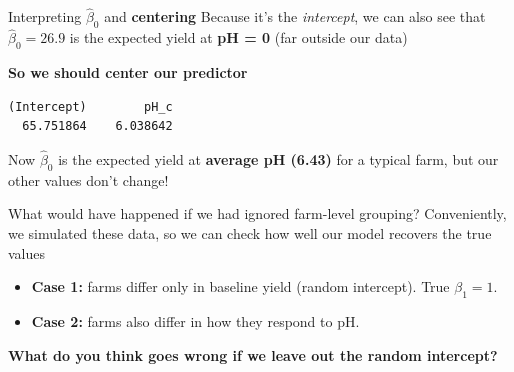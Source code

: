 \documentclass[
  ignorenonframetext,
  aspectratio=169,
]{beamer}
\newenvironment{Shaded}{\begin{snugshade}}{\end{snugshade}}
\newcommand{\AttributeTok}[1]{\textcolor[rgb]{0.40,0.45,0.13}{#1}}
\newcommand{\DecValTok}[1]{\textcolor[rgb]{0.68,0.00,0.00}{#1}}
\newcommand{\FunctionTok}[1]{\textcolor[rgb]{0.28,0.35,0.67}{#1}}
\newcommand{\NormalTok}[1]{\textcolor[rgb]{0.00,0.23,0.31}{#1}}
\newcommand{\OtherTok}[1]{\textcolor[rgb]{0.00,0.23,0.31}{#1}}
\newcommand{\SpecialCharTok}[1]{\textcolor[rgb]{0.37,0.37,0.37}{#1}}
\providecommand{\tightlist}{%
  \setlength{\itemsep}{0pt}\setlength{\parskip}{0pt}}\usepackage{longtable,booktabs,array}
\begin{document}
\begin{frame}[fragile]{Interpreting \(\hat\beta_0\) and
\textbf{centering}}
\label{interpreting-hatbeta_0-and-centering}
Because it's the \emph{intercept}, we can also see that
\(\hat\beta_0 = 26.9\) is the expected yield at \textbf{pH = 0} (far
outside our data)

\pause

\begin{center}
\textbf{So we should center our predictor}
\end{center}

\begin{Shaded}
\end{Shaded}

\begin{verbatim}
(Intercept)        pH_c 
  65.751864    6.038642 
\end{verbatim}

\pause

Now \(\hat\beta_0\) is the expected yield at \textbf{average pH (6.43)}
for a typical farm, but our other values don't change!
\end{frame}

\begin{frame}{What would have happened if we had ignored farm-level
grouping?}
\label{what-would-have-happened-if-we-had-ignored-farm-level-grouping}
Conveniently, we simulated these data, so we can check how well our
model recovers the true values

\begin{itemize}
\tightlist
\item
  \textbf{Case 1:} farms differ only in baseline yield (random
  intercept). True \(\beta_1 = 1\).
\item
  \textbf{Case 2:} farms also differ in how they respond to pH.
\end{itemize}

\pause

\begin{center}
\textbf{What do you think goes wrong if we leave out the random intercept?}
\end{center}
\end{frame}
\end{document}
